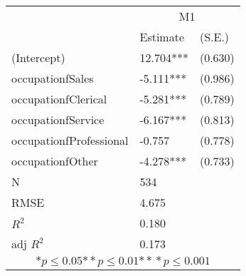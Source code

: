 \begin{tabular}{*{3}{l}}
\hline
                  & \multicolumn{2}{c}{M1}   \tabularnewline
                   &Estimate  &(S.E.)  \tabularnewline
 \hline
 \hline
   (Intercept)     &12.704***   &   (0.630) \tabularnewline
   occupationfSales    &-5.111***   &   (0.986) \tabularnewline
   occupationfClerical    &-5.281***   &   (0.789) \tabularnewline
   occupationfService    &-6.167***   &   (0.813) \tabularnewline
   occupationfProfessional    &-0.757   &   (0.778) \tabularnewline
   occupationfOther    &-4.278***   &   (0.733) \tabularnewline
 \hline
 N                 &534       &        \tabularnewline
 RMSE             &4.675         & \tabularnewline
 $R^2$             &0.180         & \tabularnewline
 adj $R^2$         &0.173         & \tabularnewline
 \hline
\hline
 
 \multicolumn{3}{c}{${*  p}\le 0.05$${*\!\!*  p}\le 0.01$${*\!\!*\!\!*  p}\le 0.001$}\tabularnewline
 \end{tabular}